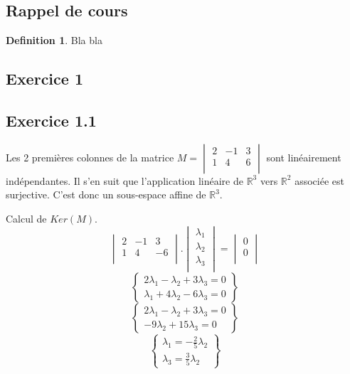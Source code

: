 \documentclass[]{book}
\theoremstyle{definition}
\newtheorem{defn}{Definition}
\newcommand{\bb}[1]{\mathbb{#1}}
\newcommand{\R}{\bb{R}}
\begin{document}
\subsection*{Rappel de cours}
\begin{defn}
Bla bla
\end{defn}



\newpage
\subsection*{Exercice 1}
\subsection*{Exercice 1.1}

Les 2 premi\`eres colonnes de la matrice $M=\begin{vmatrix}
    2 & -1 & 3 \\
    1 & 4 & 6 \\
\end{vmatrix}$ sont lin\'eairement ind\'ependantes. Il s'en suit que l'application lin\'eaire de $\R^3$ vers $\R^2$ associ\'ee est surjective. C'est donc un sous-espace affine de $\R^3$.

Calcul de $Ker(M)$.
$$
\begin{vmatrix}
    2 & -1 & 3 \\
    1 & 4 & -6 \\
\end{vmatrix} . 
\begin{vmatrix}
    \lambda_1 \\
    \lambda_2 \\
    \lambda_3 \\
\end{vmatrix}
=
\begin{vmatrix}
    0 \\
    0 \\
\end{vmatrix}
$$
$$
\left\{ 
    \begin{array}{l}
        2\lambda_1 - \lambda_2 + 3 \lambda_3 = 0 \\
        \lambda_1 + 4 \lambda_2 - 6\lambda_3 = 0
    \end{array}
\right\}
$$
$$
\left\{ 
    \begin{array}{l}
        2\lambda_1 - \lambda_2 + 3 \lambda_3 = 0 \\
         -9 \lambda_2 + 15\lambda_3 = 0
    \end{array}
\right\}
$$
$$
\left\{ 
    \begin{array}{l}
        \lambda_1 = -\frac{2}{5} \lambda_2 \\
        \lambda_3 = \frac{3}{5} \lambda_2 
    \end{array}
\right\}
$$
\end{document}
